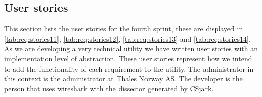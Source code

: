 \subsection{User stories}
\label{sec:req:stories4}
This section lists the user stories for the fourth sprint, these are displayed in \autoref{tab:req:stories11}, \autoref{tab:req:stories12}, \autoref{tab:req:stories13} and \autoref{tab:req:stories14}.
As we are developing a very technical \gls{utility} we have written user stories with an implementation level of abstraction. 
These user stories represent how we intend to add the functionality of each requirement to the \gls{utility}.
The administrator in this context is the administrator at Thales Norway AS. 
The developer is the person that uses \Gls{wireshark} with the \gls{dissector} generated by CSjark.

